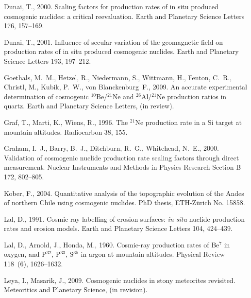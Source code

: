 \documentclass{article}
\begin{document}
\begin{thebibliography}{34}
Dunai, T., 2000. Scaling factors for production rates of in situ produced
  cosmogenic nuclides: a critical reevaluation. Earth and Planetary Science
  Letters 176, 157--169.

Dunai, T., 2001. Influence of secular variation of the geomagnetic field on
  production rates of in situ produced cosmogenic nuclides. Earth and Planetary
  Science Letters 193, 197--212.

Goethals, M.~M., Hetzel, R., Niedermann, S., Wittmann, H., Fenton, C.~R.,
  Christl, M., Kubik, P.~W., von Blanckenburg~F., 2009. An accurate
  experimental determination of cosmogenic $^{10}${B}e/$^{21}${N}e and
  $^{26}${A}l/$^{21}${N}e production ratios in quartz. Earth and Planetary
  Science Letters, (in review).

Graf, T., Marti, K., Wiens, R., 1996. The $^{21}${N}e production rate in a {S}i
  target at mountain altitudes. Radiocarbon 38, 155.

Graham, I.~J., Barry, B.~J., Ditchburn, R.~G., Whitehead, N.~E., 2000.
  Validation of cosmogenic nuclide production rate scaling factors through
  direct measurement. Nuclear Instruments and Methods in Physics Research
  Section B 172, 802--805.

Kober, F., 2004. Quantitative analysis of the topographic evolution of the
  {A}ndes of northern {C}hile using cosmogenic nuclides. PhD thesis,
  ETH-Z\"{u}rich No. 15858.

Lal, D., 1991. Cosmic ray labelling of erosion surfaces: {\it in situ} nuclide
  production rates and erosion models. Earth and Planetary Science Letters 104,
  424--439.

Lal, D., Arnold, J., Honda, M., 1960. Cosmic-ray production rates of {B}e$^7$
  in oxygen, and {P}$^{32}$, {P}$^{33}$, {S}$^{35}$ in argon at mountain
  altitudes. Physical Review 118~(6), 1626--1632.

Leya, I., Masarik, J., 2009. Cosmogenic nuclides in stony meteorites revisited.
  Meteoritics and Planetary Science, (in revision).


\end{thebibliography}
\end{document}

